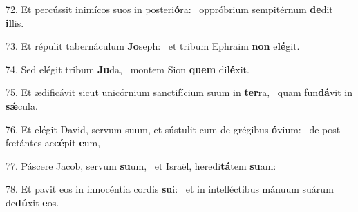 72. Et percússit inimícos suos in posteri\textbf{ó}ra: \ast\  oppróbrium sempitérnum \textbf{de}dit \textbf{il}lis.\

73. Et répulit tabernáculum \textbf{Jo}seph: \ast\  et tribum Ephraim \textbf{non} e\textbf{lé}git.\

74. Sed elégit tribum \textbf{Ju}da, \ast\  montem Sion \textbf{quem} di\textbf{lé}xit.\

75. Et ædificávit sicut unicórnium sanctifícium suum in \textbf{ter}ra, \ast\  quam fun\textbf{dá}vit in \textbf{sǽ}cula.\

76. Et elégit David, servum suum, et sústulit eum de grégibus \textbf{ó}vium: \ast\  de post fœtántes ac\textbf{cé}pit \textbf{e}um,\

77. Páscere Jacob, servum \textbf{su}um, \ast\  et Israël, heredi\textbf{tá}tem \textbf{su}am:\

78. Et pavit eos in innocéntia cordis \textbf{su}i: \ast\  et in intelléctibus mánuum suárum de\textbf{dú}xit \textbf{e}os.\

